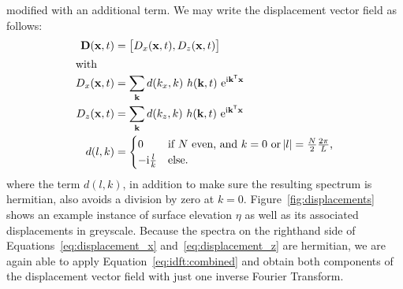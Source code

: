 modified with an additional term. We may write the displacement vector field as follows:
\begin{align}
 \mathbf{D}(\mathbf{x},t) &= \left[D_x(\mathbf{x},t), D_z(\mathbf{x},t)\right]\\
\intertext{with}
\label{eq:displacement_x} D_x(\mathbf{x},t) &= \sum_{\mathbf{k}}d(k_x, 
k)~h(\mathbf{k},t)~\mathrm{e}^{\mathrm{i}\mathbf{k}^{\mathsf{T}}\mathbf{x}} \\
\label{eq:displacement_z} D_z(\mathbf{x},t) &= \sum_{\mathbf{k}}d(k_z, 
k)~h(\mathbf{k},t)~\mathrm{e}^{\mathrm{i}\mathbf{k}^{\mathsf{T}}\mathbf{x}} \\
 d(l, k) &= \begin{cases}
             0 &\text{if $N$ even, and $k = 0$ or $\abs{l} = 
\frac{N}{2}\frac{2\pi}{L}$,} \\
             -\mathrm{i}\frac{l}{k} &\text{else.}
            \end{cases}
\end{align}
where the term $d(l, k)$, in addition to make sure the resulting spectrum is 
hermitian, also avoids a division by zero at $k = 0$. 
Figure~\ref{fig:displacements} shows an example instance of surface elevation 
$\eta$ as well as its associated displacements in greyscale.
Because the spectra on the righthand side of Equations~\ref{eq:displacement_x} 
and~\ref{eq:displacement_z} are hermitian, we are again able to apply 
Equation~\ref{eq:idft:combined} and obtain both components of the displacement 
vector field with just one inverse Fourier Transform.



